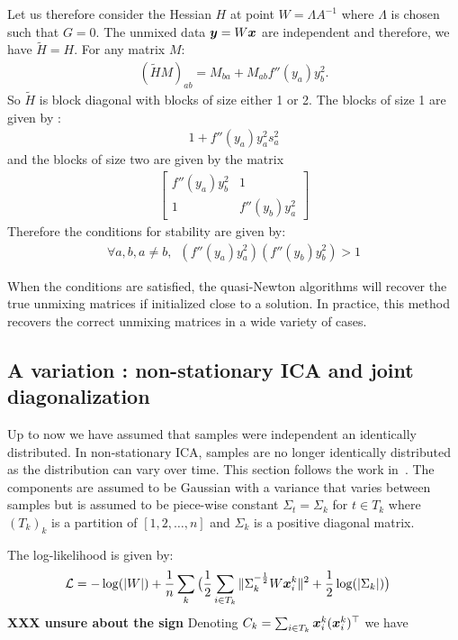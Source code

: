 Let us therefore consider the Hessian $H$ at point $W = \Lambda A^{-1}$ where
$\Lambda$ is chosen such that $G = 0$. The unmixed data $\boldsymbol{y} = W \boldsymbol{x}$ are independent and
therefore, we have $\tilde{H} = H$.
For any matrix $M$:
\begin{align}(\tilde{H} M)_{ab} = M_{ba} + M_{ab} f''(y_a)y_b^2.
\end{align}
So $\tilde{H}$ is block diagonal with blocks of size either 1 or 2.
The blocks of size 1 are given by :
\begin{align}
  1 + f''(y_a) y_a^2
  s_a^2
\end{align}
and the blocks of size
two are given by the matrix
\begin{align}
                              \begin{bmatrix} f''(y_a) y_b^2
  & 1 \\ 1 &
  f''(y_b)y_a^2 \end{bmatrix}
\end{align}
Therefore the conditions for stability are given by:
\begin{align}
  \forall a, b, a \neq b, \enspace \left(f''(y_a) y_a^2 \right) \left(f''(y_b)  y_b^2 \right) > 1
\end{align}

When the conditions are satisfied, the quasi-Newton algorithms will recover the
true unmixing matrices if initialized close to a solution. In practice, this
method recovers the correct unmixing matrices in a wide variety of cases.

\subsection{A variation : non-stationary ICA and joint diagonalization}
Up to now we have assumed that samples were independent an identically distributed. In non-stationary ICA, samples are no longer identically distributed as the distribution can vary over time.
This section follows the work in~\cite{pham2001blind}.
The components are assumed to be Gaussian with a variance that varies between
samples but is assumed to be piece-wise constant $\Sigma_t = \Sigma_k$ for $t \in
T_k$ where $(T_k)_k$ is a partition of $[1, 2, \dots, n]$ and $\Sigma_k$ is a
positive diagonal matrix.

The log-likelihood is given by:
\begin{align}  
  \mathcal{L} &= -\log(|W|)  + \frac1{n} \sum_k \big( \frac12 \sum_{i \in T_k}\|\Sigma_k^{-\frac12} W \boldsymbol{x}^k_i \|^2 + \frac12 \log(|\Sigma_k|) \big)
\end{align}
\textbf{XXX unsure about the sign}
Denoting $C_k = \sum_{i \in T_k} \boldsymbol{x}_i^k (\boldsymbol{x}_i^k)^{\top}$ we have 

